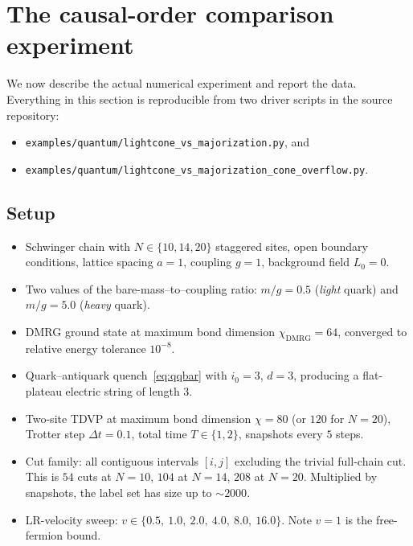 \documentclass[11pt,a4paper]{article}
\theoremstyle{definition}
\theoremstyle{plain}
\theoremstyle{remark}
\begin{document}
\section{The causal-order comparison experiment}\label{sec:results}

We now describe the actual numerical experiment and report the data.
Everything in this section is reproducible from two driver scripts in
the source repository:
\begin{itemize}[nosep]
  \item \texttt{examples/quantum/lightcone\_vs\_majorization.py}, and
  \item \texttt{examples/quantum/lightcone\_vs\_majorization\_cone\_overflow.py}.
\end{itemize}

\subsection{Setup}

\begin{itemize}[nosep]
\item Schwinger chain with $N \in \{10, 14, 20\}$ staggered sites,
      open boundary conditions, lattice spacing $a = 1$, coupling
      $g = 1$, background field $L_0 = 0$.
\item Two values of the bare-mass--to--coupling ratio:
      $m/g = 0.5$ (\emph{light} quark) and $m/g = 5.0$
      (\emph{heavy} quark).
\item DMRG ground state at maximum bond dimension $\chi_{\mathrm{DMRG}} = 64$,
      converged to relative energy tolerance $10^{-8}$.
\item Quark--antiquark quench~\eqref{eq:qqbar} with $i_0 = 3$,
      $d = 3$, producing a flat-plateau electric string of length $3$.
\item Two-site TDVP at maximum bond dimension $\chi = 80$ (or $120$
      for $N = 20$), Trotter step $\Delta t = 0.1$, total time
      $T \in \{1, 2\}$, snapshots every $5$ steps.
\item Cut family: all contiguous intervals $[i, j]$ excluding the
      trivial full-chain cut.  This is $54$ cuts at $N = 10$, $104$ at
      $N = 14$, $208$ at $N = 20$.  Multiplied by snapshots, the label
      set has size up to $\sim 2000$.
\item LR-velocity sweep: $v \in \{0.5,\ 1.0,\ 2.0,\ 4.0,\ 8.0,\ 16.0\}$.
      Note $v = 1$ is the free-fermion bound.
\end{itemize}
\end{document}
